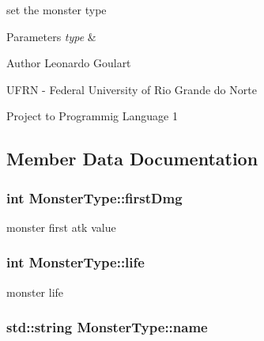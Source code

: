 set the monster type 


\begin{DoxyParams}{Parameters}
{\em type} & \\
\hline
\end{DoxyParams}
\begin{DoxyAuthor}{Author}
Leonardo Goulart 

U\+F\+RN -\/ Federal University of Rio Grande do Norte 

Project to Programmig Language 1 
\end{DoxyAuthor}


\subsection{Member Data Documentation}
\subsubsection[{\texorpdfstring{first\+Dmg}{firstDmg}}]{\setlength{\rightskip}{0pt plus 5cm}int Monster\+Type\+::first\+Dmg\hspace{0.3cm}{\ttfamily [private]}}\hypertarget{classMonsterType_af4fb712892776b49285c3c22451a1301}{}\label{classMonsterType_af4fb712892776b49285c3c22451a1301}


monster first atk value 

\subsubsection[{\texorpdfstring{life}{life}}]{\setlength{\rightskip}{0pt plus 5cm}int Monster\+Type\+::life\hspace{0.3cm}{\ttfamily [private]}}\hypertarget{classMonsterType_a7bf9b815774b041af4d5f51ce25ae5c3}{}\label{classMonsterType_a7bf9b815774b041af4d5f51ce25ae5c3}


monster life 

\subsubsection[{\texorpdfstring{name}{name}}]{\setlength{\rightskip}{0pt plus 5cm}std\+::string Monster\+Type\+::name\hspace{0.3cm}{\ttfamily [private]}}\hypertarget{classMonsterType_a7d5203fcca6105cc491d672dadfa2ab5}{}\label{classMonsterType_a7d5203fcca6105cc491d672dadfa2ab5}


